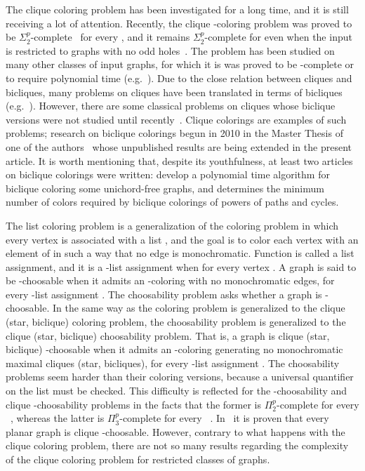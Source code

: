 \documentclass[a4paper, 11pt, oneside]{article}
\newcommand{\ptwop}{\ensuremath{\Pi^p_2}\xspace}
\newcommand{\stp}{\ensuremath{\Sigma^p_2}\xspace}
\newcommand{\ptp}{\ensuremath{\Pi^p_3}\xspace}
\begin{document}
The clique coloring problem has been investigated for a long time, and it is still receiving a lot of attention.  Recently, the clique -coloring problem was proved to be \stp-complete~\cite{MarxTCS2011} for every , and it remains \stp-complete for  even when the input is restricted to graphs with no odd holes~\cite{DefossezJGT2009}.  The problem has been studied on many other classes of input graphs, for which it is was proved to be \NP-complete or to require polynomial time (e.g.~\cite{BacsoGravierGyarfasPreissmannSebHoSJDM2004,CerioliKorenchendler2009,DefossezJGT2006,GravierHoangMaffrayDM2003,KratochvilTuzaJA2002,MacedoMachadoFigueiredo2012}).  Due to the close relation between cliques and bicliques, many problems on cliques have been translated in terms of bicliques (e.g.~\cite{AmilhastreVilaremJanssenDAM1998,PrisnerC2000a,TuzaC1984}).  However, there are some classical problems on cliques whose biclique versions were not studied until recently~\cite{EguiaSoulignacDMTCS2012,GroshausMonteroJoGT2012,GroshausSzwarcfiterGC2007,GroshausSzwarcfiterJGT2010}.  Clique colorings are examples of such problems; research on biclique colorings begun in 2010 in the Master Thesis of one of the authors~\cite{Terlisky2010} whose unpublished results are being extended in the present article.  It is worth mentioning that, despite its youthfulness, at least two articles on biclique colorings were written: \cite{MacedoMachadoFigueiredo2012} develop a polynomial time algorithm for biclique coloring some unichord-free graphs, and \cite{MacedoDantasMachadoFigueiredo2012} determines the minimum number of colors required by biclique colorings of powers of paths and cycles.

The list coloring problem is a generalization of the coloring problem in which every vertex  is associated with a list , and the goal is to color each vertex  with an element of  in such a way that no edge is monochromatic.  Function  is called a list assignment, and it is a -list assignment when  for every vertex .  A graph  is said to be -choosable when it admits an -coloring with no monochromatic edges, for every -list assignment .  The choosability problem asks whether a graph is -choosable. In the same way as the coloring problem is generalized to the clique (star, biclique) coloring problem, the choosability problem is generalized to the clique (star, biclique) choosability problem.  That is, a graph  is clique (star, biclique) -choosable when it admits an -coloring generating no monochromatic maximal cliques (star, bicliques), for every -list assignment .  The choosability problems seem harder than their coloring versions, because a universal quantifier on the list must be checked.  This difficulty is reflected for the -choosability and clique -choosability problems in the facts that the former is \ptwop-complete for every ~\cite{GutnerTarsiDM2009}, whereas the latter is \ptp-complete for every ~\cite{MarxTCS2011}.  In~\cite{MoharvSkrekovskiEJC1999} it is proven that every planar graph is clique -choosable.  However, contrary to what happens with the clique coloring problem, there are not so many results regarding the complexity of the clique coloring problem for restricted classes of graphs.
\end{document}
